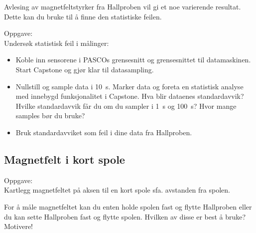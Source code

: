 \documentclass[../Elmag-labhefte-2020.tex]{subfiles}
\begin{document}
Avlesing av magnetfeltstyrker fra Hallproben vil gi et noe varierende resultat. Dette kan du bruke til å finne den statistiske feilen.

Oppgave:\\
{\itsf Undersøk statistisk feil i målinger:}
\vspace{-5mm}
\begin{itemize}
    \item Koble inn sensorene i PASCOs grensesnitt og grensesnittet til datamaskinen. Start Capstone og gjør klar til datasampling.
    \item Nullstill og sample data i \SI{10}{\s}. Marker data og foreta en statistisk analyse med innebygd funksjonalitet i Capstone. Hva blir dataenes standardavvik? Hvilke standardavvik får du om du sampler i \SI{1}{\s} og \SI{100}{\s}? Hvor mange samples bør du bruke?
    \item Bruk standardavviket som feil i dine data fra Hallproben.
\end{itemize}

\subsection{Magnetfelt i kort spole}

Oppgave:\\
{\itsf Kartlegg magnetfeltet på aksen til en kort spole sfa. avstanden fra spolen.}
 

For å måle magnetfeltet kan du enten holde spolen fast og flytte Hallproben eller du kan sette Hallproben fast og flytte spolen.
Hvilken av disse er best å bruke? Motivere!
\end{document}
